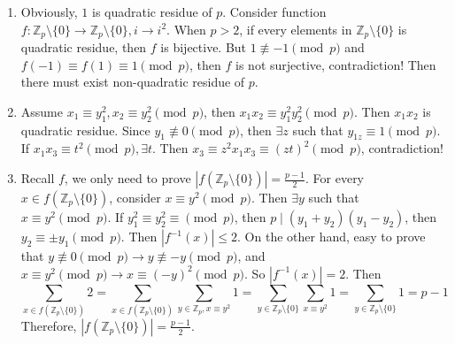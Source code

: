 \documentclass{ctexart}
\begin{document}
\begin{solution}
  \begin{enumerate}
    \item Obviously, \(1\) is quadratic residue of \(p\). Consider function \(f: \mathbb{Z}_p\setminus\{0\} \to \mathbb{Z}_p\setminus\{0\},i \to i^2\).
      When \(p >2\), if every elements in \(\mathbb{Z}_p\setminus\{0\}\) is quadratic residue, then \(f\) is bijective. But
      \(1 \not \equiv -1 \pmod{p} \) and \(f(-1)\equiv f(1)\equiv 1 \pmod{p}\),
      then \(f\) is not surjective, contradiction!
      Then there must exist non-quadratic residue of \(p\).
    \item Assume \(x_1 \equiv y_1^2,x_2 \equiv y_2^2 \pmod{p}\), then \(x_1x_2 \equiv y_1^2y_2^2 \pmod{p} \). Then \(x_1x_2\) is quadratic residue.
      Since \(y_1 \not \equiv 0 \pmod{p}\), then \(\exists z\) such that \(y_{1z} \equiv 1 \pmod{p}\).
      If \(x_1x_3 \equiv t^2 \pmod{p}, \exists t\). Then \(x_3 \equiv z^2x_1x_3 \equiv (zt)^2 \pmod{p}\), contradiction!
    \item Recall \(f\), we only need to prove \(|f(\mathbb{Z}_p\setminus\{0\})|=\frac{p-1}{2}\).
      For every \(x \in f(\mathbb{Z}_p\setminus\{0\})\), consider \(x \equiv y^2 \pmod{p}\). Then \(\exists y\) such that \(x \equiv y^2 \pmod{p}\).
      If \(y_1^2 \equiv y_2^2 \equiv \pmod{p}\), then \(p \mid (y_1 + y_2)(y_1-y_2)\), then \(y_2 \equiv \pm y_1 \pmod{p}\).
      Then \(|f^{-1}(x)| \leq 2\). On the other hand, easy to prove that \(y \not \equiv 0 \pmod{p} \to y \not \equiv -y \pmod{p}\),
      and \(x \equiv y^2 \pmod{p} \to x \equiv (-y)^2 \pmod{p}\). So \(|f^{-1}(x)|=2\). Then \[
        \sum_{x \in f(\mathbb{Z}_p\setminus\{0\})}2 = \sum_{x \in f(\mathbb{Z}_p\setminus\{0\})}\sum_{y \in \mathbb{Z}_p, x \equiv y^2 }1 = \sum_{y \in \mathbb{Z}_p\setminus\{0\}}\sum_{x \equiv y^2}1=\sum_{y \in \mathbb{Z}_p\setminus\{0\}}1=p-1
      \]
      Therefore, \(|f(\mathbb{Z}_p\setminus\{0\})|=\frac{p-1}{2}\).
  \end{enumerate}
\end{solution}
\end{document}
